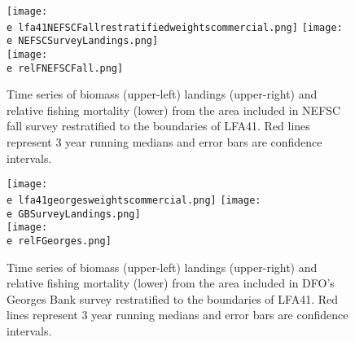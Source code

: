 \documentclass[11pt]{article}
\newcommand{\e}{/backup/bio_data/bio.lobster/figures/} %
\begin{document}
\begin{figure}

    \texttt{[image: \\e lfa41NEFSCFallrestratifiedweightscommercial.png]}
    \texttt{[image: \\e NEFSCSurveyLandings.png]} \\
    \texttt{[image: \\e relFNEFSCFall.png]} \\
    \caption{Time series of biomass (upper-left) landings (upper-right) and relative fishing mortality (lower) from the area included in NEFSC fall survey restratified to the boundaries of LFA41. Red lines represent 3 year running medians and error bars are confidence intervals.}

\end{figure}


\begin{figure}

    \texttt{[image: \\e lfa41georgesweightscommercial.png]}
    \texttt{[image: \\e GBSurveyLandings.png]} \\
    \texttt{[image: \\e relFGeorges.png]} \\
    \caption{Time series of biomass (upper-left) landings (upper-right) and relative fishing mortality (lower) from the area included in DFO's Georges Bank survey restratified to the boundaries of LFA41. Red lines represent 3 year running medians and error bars are confidence intervals.}

\end{figure}
\end{document}
